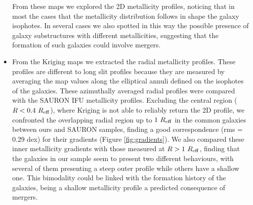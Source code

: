 \begin{itemize}
{%
					From these maps we explored the 2D metallicity profiles, noticing that in most the cases that the metallicity 
					distribution follows in shape the galaxy isophotes. 
					In several cases we also spotted in this way the possible presence of galaxy substructures with different 
					metallicities, suggesting that the formation of such galaxies could involve mergers. 
					}					
					
					
%
%
%	  
  
   
		\item	{
					From the Kriging maps we extracted the radial metallicity profiles. 
					These profiles are different to long slit profiles because they are measured by averaging the map 
					values along the elliptical annuli defined on the isophotes 
					of the galaxies. 
					These azimuthally averaged radial profiles were compared with the SAURON IFU metallicity profiles.
					Excluding the central region ($R<0.4~R_{\rm{eff}}$), where Kriging is not able to reliably return the 2D profile, 
					we confronted the overlapping radial region up to $1~R_{\rm{eff}}$ in the common galaxies between ours 
					and SAURON samples, finding a good correspondence (rms = 0.29 dex) for their gradients (Figure \ref{fig:gradients}). 
					We also compared these inner metallicity gradients with those measured at $R>1~R_{\rm{eff}}$, finding that 
					the galaxies in our sample seem to present two different behaviours, with several of them presenting a steep outer 
					profile while others have a shallow one. 
					This bimodality could be linked with the formation history of the galaxies, being a shallow metallicity profile 
					a predicted consequence of mergers. 
					}
	\end{itemize}	 
